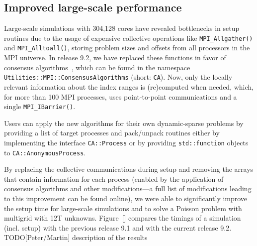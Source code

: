 \documentclass{ansarticle-preprint}
\begin{document}
\subsection{Improved large-scale performance}
\label{subsec:performance}

Large-scale simulations with 304,128 cores have revealed bottlenecks in setup
routines due to the usage of expensive collective operations
like \texttt{MPI\_Allgather()} and \texttt{MPI\_\allowbreak Alltoall()}, storing
problem sizes and offsets from all processors in the MPI universe.
In release 9.2, we have replaced these functions in favor of
consensus algorithms~\cite{hoefler2010scalable}, which can be
found in the namespace \texttt{Utilities::\allowbreak MPI::\allowbreak ConsensusAlgorithms} (short: \texttt{CA}).
Now, only the locally relevant information about the index ranges is
(re)computed when needed, which, for more than 100 MPI processes, uses
point-to-point communications and a single \texttt{MPI\_IBarrier()}.


Users can apply the new algorithms for their own dynamic-sparse problems by
providing a list of target
processes and pack/unpack routines either by implementing the interface
\texttt{CA::\allowbreak Process} or by providing \texttt{std::function}
objects to \texttt{CA::AnonymousProcess}.

By replacing the collective communications during setup and removing the arrays
that contain information for each process (enabled by the application of consensus
algorithms and other modifications---a full list of modifications leading to this
improvement can be found online), we were able to significantly improve the setup
time for large-scale simulations and to solve a Poisson problem with multigrid
with 12T unknowns.
Figure~\ref{} compares the timings of a simulation (incl. setup) with the
previous release 9.1 and with the current release 9.2.
{\color{red}TODO[Peter/Martin] description of the results}
\end{document}
